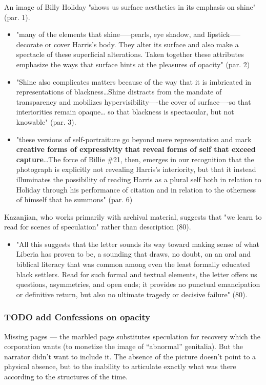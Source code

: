 \documentclass[11pt]{article}
\begin{document}
An image of Billy Holiday "shows us surface aesthetics in its emphasis
on shine" (par. 1).
\begin{itemize}
\item "many of the elements that shine—--pearls, eye shadow, and
lipstick--—decorate or cover Harris’s body. They alter its surface and
also make a spectacle of these superficial alterations. Taken
together these attributes emphasize the ways that surface hints at
the pleasures of opacity" (par. 2)
\item "Shine also complicates matters because of the way that it is
imbricated in representations of blackness\ldots{}Shine distracts from
the mandate of transparency and mobilizes hypervisibility—-the
cover of surface—-so that interiorities remain opaque\ldots{} so that
blackness is spectacular, but not knowable" (par. 3).
\item "these versions of self-portraiture go beyond mere representation
and mark \textbf{creative forms of expressivity that reveal forms of self
that exceed capture}\ldots{}The force of Billie \#21, then, emerges in
our recognition that the photograph is explicitly not revealing
Harris’s interiority, but that it instead illuminates the
possibility of reading Harris as a plural self both in relation to
Holiday through his performance of citation and in relation to the
otherness of himself that he summons" (par. 6)
\end{itemize}

Kazanjian, who works primarily with archival material, suggests that
"we learn to read for scenes of speculation" rather than description
(80).
\begin{itemize}
\item "All this suggests that the letter sounds its way toward making
sense of what Liberia has proven to be, a sounding that draws, no
doubt, on an oral and biblical literacy that was common among even
the least formally educated black settlers. Read for such formal and
textual elements, the letter offers us questions, asymmetries, and
open ends; it provides no punctual emancipation or definitive
return, but also no ultimate tragedy or decisive failure" (80).
\end{itemize}

\subsubsection{{\bfseries\sffamily TODO} add Confessions on opacity}
\label{sec:orgb6ef9b3}
Missing pages --- the marbled page substitutes speculation for recovery which the corporation wants (to monetize the image of “abnormal” genitalia). But the narrator didn’t want to include it. The absence of the picture doesn’t point to a physical absence, but to the inability to articulate exactly what was there according to the structures of the time.
\end{document}
